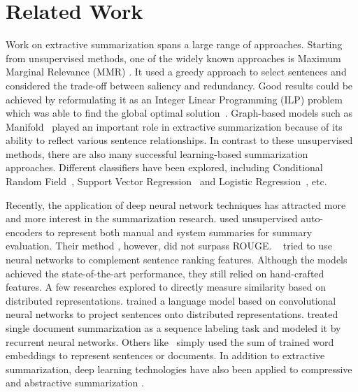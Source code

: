 \documentclass[letterpaper]{article}
\begin{document}
\section{Related Work}
Work on extractive summarization spans a large range of approaches.
Starting from unsupervised methods, one of the widely known approaches is Maximum Marginal Relevance (MMR) \cite{carbonell1998use}. It used a greedy approach to select sentences and considered the trade-off between saliency and redundancy.
Good results could be achieved by reformulating it as an Integer Linear Programming (ILP) problem which was able to find the global optimal solution~\cite{mcdonald2007study,gillick2009scalable}.
Graph-based models such as Manifold~\cite{wan2009graph} played an important role in extractive summarization because of its ability to reflect various sentence relationships.
In contrast to these unsupervised methods, there are also many successful learning-based summarization approaches.
Different classifiers have been explored, including Conditional Random Field~\cite{galley2006skip}, Support Vector Regression~\cite{li2007multi} and Logistic Regression~\cite{li2013using}, etc.

Recently, the application of deep neural network techniques has attracted more and more interest in the summarization research.
\cite{genest2011deep} used unsupervised auto-encoders to represent both manual and system summaries for summary evaluation.
Their method , however, did not surpass ROUGE.
~\cite{cao2015ranking,cao2015learning} tried to use neural networks to complement sentence ranking features.
Although the models achieved the state-of-the-art performance, they still relied on hand-crafted features.
A few researches explored to directly measure similarity based on distributed representations.
\cite{yin2015optimizing} trained a language model based on convolutional neural networks to project sentences onto distributed representations.
\cite{cheng2016neural} treated single document summarization as a sequence labeling task and modeled it by recurrent neural networks.
Others like~\cite{kobayashi-noguchi-yatsuka:2015:EMNLP} simply used the sum of trained word embeddings to represent sentences or documents.
In addition to extractive summarization, deep learning technologies have also been applied to compressive and abstractive summarization \cite{filippova-EtAl:2015:EMNLP,rush-chopra-weston:2015:EMNLP}.

\vspace{-2.55mm}
\end{document}
